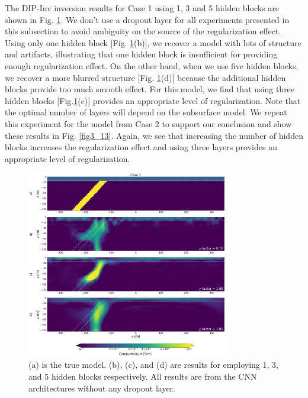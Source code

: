 \documentclass[lettersize,journal]{IEEEtran}
\begin{document}
The DIP-Inv inversion results for Case 1 using 1, 3 and 5 hidden blocks are shown in Fig. \ref{fig3_12}. 
We don't use a dropout layer for all experiments presented in this subsection to avoid ambiguity on the source of the regularization effect. 
Using only one hidden block [Fig. \ref{fig3_12}(b)], we recover a model with lots of structure and artifacts, illustrating that one hidden block is insufficient for providing enough regularization effect.
On the other hand, when we use five hidden blocks, we recover a more blurred structure [Fig. \ref{fig3_12}(d)] because the additional hidden blocks provide too much smooth effect. 
For this model, we find that using three hidden blocks [Fig.\ref{fig3_12}(c)] provides an appropriate level of regularization. 
Note that the optimal number of layers will depend on the subsurface model. 
We repeat this experiment for the model from Case 2 to support our conclusion and show these results in Fig. \ref{fig3_13}. Again, we see that increasing the number of hidden blocks increases the regularization effect and using three layers provides an appropriate level of regularization. 

\begin{figure}[!t]
\centering
\includegraphics[width=3.5in]{Figures/xu13.png}
\caption{(a) is the true model. (b), (c), and (d) are results for employing 1, 3, and 5 hidden blocks respectively. All results are from the CNN architectures without any dropout layer.}
\label{fig3_12}
\end{figure}
\end{document}
